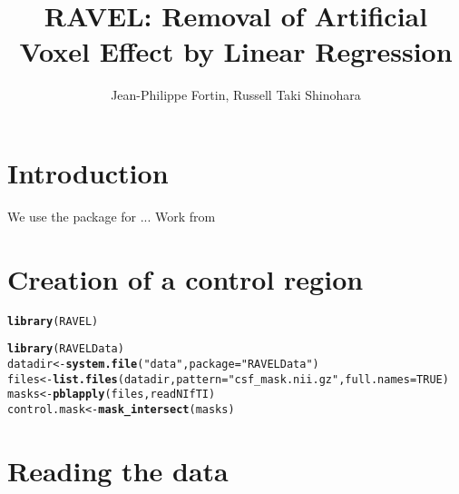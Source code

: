 \documentclass[12pt]{article}\usepackage[]{graphicx}\usepackage[]{color}
\title{RAVEL: Removal of Artificial Voxel Effect by Linear Regression}
\author{Jean-Philippe Fortin, Russell Taki Shinohara}
\makeatletter
\newcommand{\hlnum}[1]{\textcolor[rgb]{0.686,0.059,0.569}{#1}}%
\newcommand{\hlstr}[1]{\textcolor[rgb]{0.192,0.494,0.8}{#1}}%
\newcommand{\hlstd}[1]{\textcolor[rgb]{0.345,0.345,0.345}{#1}}%
\newcommand{\hlkwb}[1]{\textcolor[rgb]{0.69,0.353,0.396}{#1}}%
\newcommand{\hlkwc}[1]{\textcolor[rgb]{0.333,0.667,0.333}{#1}}%
\newcommand{\hlkwd}[1]{\textcolor[rgb]{0.737,0.353,0.396}{\textbf{#1}}}%
\newenvironment{kframe}{%
 \def\at@end@of@kframe{}%
 \ifinner\ifhmode%
  \def\at@end@of@kframe{\end{minipage}}%
  \begin{minipage}{\columnwidth}%
 \fi\fi%
 \def\FrameCommand##1{\hskip\@totalleftmargin \hskip-\fboxsep
 \colorbox{shadecolor}{##1}\hskip-\fboxsep
     \hskip-\linewidth \hskip-\@totalleftmargin \hskip\columnwidth}%
 \MakeFramed {\advance\hsize-\width
   \@totalleftmargin\z@ \linewidth\hsize
   \@setminipage}}%
 {\par\unskip\endMakeFramed%
 \at@end@of@kframe}
\newenvironment{knitrout}{}{} %
\makeatother
\begin{document}
\maketitle{}
\setcounter{secnumdepth}{1} 

\section{Introduction}

We use the package \cite{whitestripe:package} for ... 
Work from \cite{ravel}


\section{Creation of a control region}
\begin{knitrout}
\color{fgcolor}\begin{kframe}
\begin{alltt}
\hlkwd{library}\hlstd{(RAVEL)}
\end{alltt}


{\ttfamily\noindent\itshape\color{messagecolor}{\#\# Loading required package: WhiteStripe\\\#\# Loading required package: fslr\\\#\# Loading required package: stringr\\\#\# Loading required package: oro.nifti\\\#\# oro.nifti 0.5.2\\\#\# Loading required package: pbapply}}\begin{alltt}
\hlkwd{library}\hlstd{(RAVELData)}
\hlstd{datadir} \hlkwb{<-} \hlkwd{system.file}\hlstd{(}\hlstr{"data"}\hlstd{,}\hlkwc{package}\hlstd{=}\hlstr{"RAVELData"}\hlstd{)}
\hlstd{files} \hlkwb{<-} \hlkwd{list.files}\hlstd{(datadir,} \hlkwc{pattern}\hlstd{=}\hlstr{"csf_mask.nii.gz"}\hlstd{,} \hlkwc{full.names}\hlstd{=}\hlnum{TRUE}\hlstd{)}
\hlstd{masks} \hlkwb{<-} \hlkwd{pblapply}\hlstd{(files, readNIfTI)}
\hlstd{control.mask}\hlkwb{<-} \hlkwd{mask_intersect}\hlstd{(masks)}
\end{alltt}
\end{kframe}
\end{knitrout}


\section{Reading the data}
\end{document}
